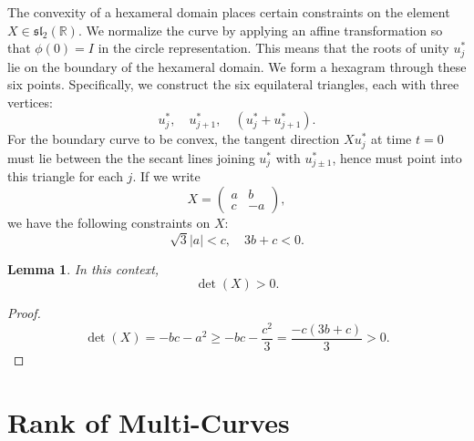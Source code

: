 \documentclass[11pt]{amsart}
\newtheorem{lemma}[equation]{Lemma}
\newcommand{\ring}[1]{\mathbb{#1}}
\begin{document}
The convexity of a hexameral domain places certain constraints on the
element $X\in\mathfrak{sl}_2(\ring{R})$.  We normalize the curve by
applying an affine transformation so that $\phi(0)=I$ in the circle
representation.  This means that the roots of unity $u^*_j$ lie on the
boundary of the hexameral domain.  We form a hexagram through these
six points.  Specifically, we construct the six equilateral triangles,
each with three vertices:
   $$
   u^*_j,\quad u^*_{j+1},\quad (u^*_j + u^*_{j+1}).
$$
For the boundary curve to be convex, the tangent direction $X u^*_j$ at time $t=0$ must lie
between the the secant lines joining $u^*_j$ with $u^*_{j\pm 1}$,
hence must point into this triangle for each $j$.  If we write
$$X  = \left(\begin{matrix} a & b \\ c & -a \end{matrix}\right),$$
we have the following constraints on $X$:
\begin{equation}\label{eqn:star}
\sqrt{3} |a| < c,\quad 3 b + c < 0.
\end{equation}

\begin{lemma}
In this context,
$$\det(X) > 0.$$
\end{lemma}

\begin{proof} 
$$\det(X) = - b c - a^2 \ge - b c  - \frac{c^2}{3} = \frac{-c(3 b + c)}{3} >0.$$
\end{proof}



\section{Rank of Multi-Curves}


\end{document}
